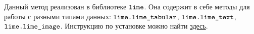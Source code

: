 Данный метод реализован в библиотеке $\verb|lime|$. Она содержит в себе методы для работы с разными типами данных: $\verb|lime.lime_tabular|$, $\verb|lime.lime_text|$, $\verb|lime.lime_image|$. Инструкцию по установке можно найти \href{https://github.com/marcotcr/lime}{здесь}.